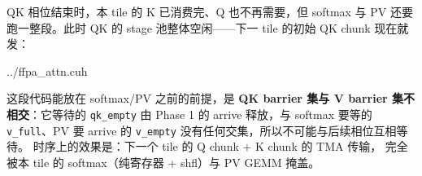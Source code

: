 QK 相位结束时，本 tile 的 K 已消费完、Q 也不再需要，但 softmax 与
PV 还要跑一整段。此时 QK 的 stage 池整体空闲——下一 tile 的初始
QK chunk 现在就发：

\begin{lstinputlisting}[linerange={1083-1094},firstnumber=auto,
  title={ffpa\_attn.cuh L1083-1094（跨 tile 预取：下一 tile 的 QK 初始 chunk）}]{../ffpa_attn.cuh}
\end{lstinputlisting}

这段代码能放在 softmax/PV 之前的前提，是 \textbf{QK barrier 集与
V barrier 集不相交}：它等待的 \texttt{qk\_empty} 由 Phase 1 的 arrive
释放，与 softmax 要等的 \texttt{v\_full}、PV 要 arrive 的
\texttt{v\_empty} 没有任何交集，所以不可能与后续相位互相等待。
时序上的效果是：下一个 tile 的 Q chunk + K chunk 的 TMA 传输，
完全被本 tile 的 softmax（纯寄存器 + shfl）与 PV GEMM 掩盖。

